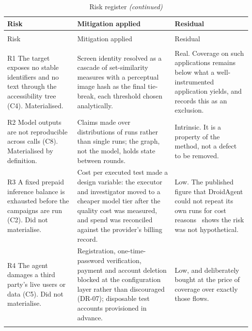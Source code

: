 \begingroup
\small
\begin{xltabular}{\textwidth}{@{}>{\hsize}Y>{\hsize}Y>{\hsize}Y@{}}
  \caption{Risk register: exposure, mitigation and residual risk}
  \label{tab:risks}\\
  \toprule
  Risk & Mitigation applied & Residual \\
  \midrule
  \endfirsthead
  \caption[]{Risk register \emph{(continued)}}\\
  \toprule
  Risk & Mitigation applied & Residual \\
  \midrule
  \endhead
  \midrule
  \\
  \endfoot
  \bottomrule
  \endlastfoot

  R1 The target exposes no stable identifiers and no text through the accessibility tree (C4). Materialised. &
    Screen identity resolved as a cascade of set-similarity measures with a perceptual image hash as the final tie-break, each threshold chosen analytically. &
    Real. Coverage on such applications remains below what a well-instrumented application yields, and  records this as an exclusion. \\
  \addlinespace
  R2 Model outputs are not reproducible across calls (C8). Materialised by definition. &
    Claims made over distributions of runs rather than single runs; the graph, not the model, holds state between rounds. &
    Intrinsic. It is a property of the method, not a defect to be removed. \\
  \addlinespace
  R3 A fixed prepaid inference balance is exhausted before the campaigns are run (C2). Did not materialise. &
    Cost per executed test made a design variable: the executor and investigator moved to a cheaper model tier after the quality cost was measured, and spend was reconciled against the provider's billing record. &
    Low. The published figure that DroidAgent could not repeat its own runs for cost reasons~\cite{droidagent} shows the risk was not hypothetical. \\
  \addlinespace
  R4 The agent damages a third party's live users or data (C5). Did not materialise. &
    Registration, one-time-password verification, payment and account deletion blocked at the configuration layer rather than discouraged (DR-07); disposable test accounts provisioned in advance. &
    Low, and deliberately bought at the price of coverage over exactly those flows. \\
  \addlinespace

\end{xltabular}
